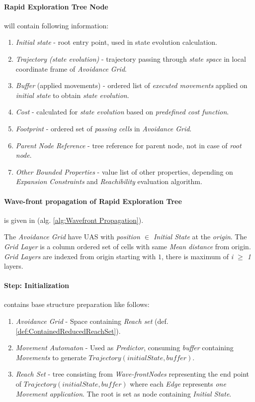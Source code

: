 \paragraph{Rapid Exploration Tree Node} will contain following information:
\begin{enumerate}
    \item \emph{Initial state} - root entry point, used in state evolution calculation.
    \item \emph{Trajectory (state evolution)} - trajectory passing through \emph{state space} in local coordinate frame of \emph{Avoidance Grid}.
    \item \emph{Buffer} (applied movements) - ordered list of \emph{executed movements} applied on \emph{initial state} to obtain \emph{state evolution}.
    \item \emph{Cost} - calculated for \emph{state evolution} based on \emph{predefined cost function}. 
    \item \emph{Footprint} - ordered set of \emph{passing cells} in \emph{Avoidance Grid}.
    \item \emph{Parent Node Reference} - tree reference for parent node, not in case of \emph{root node}.
    \item \emph{Other Bounded Properties} - value list of other properties, depending on \emph{Expansion Constraints} and \emph{Reachibility} evaluation algorithm.
\end{enumerate}

\paragraph{Wave-front propagation of Rapid Exploration Tree} is given in (alg. \ref{alg:Wavefront Propagation}). 

The \emph{Avoidance Grid} have UAS with \emph{position $\in$ Initial State} at the \emph{origin}. The \emph{Grid Layer} is a column ordered set of cells with same \emph{Mean distance} from origin. \emph{Grid Layers} are indexed from origin starting with $1$, there is maximum of \emph{i $\ge$ 1} layers.

\paragraph{Step: Initialization} contains base structure preparation like follows:
\begin{enumerate}
    \item \emph{Avoidance Grid} - Space containing \emph{Reach set} (def. \ref{def:ContainedReducedReachSet}).
    \item \emph{Movement Automaton} - Used as \emph{Predictor}, consuming \emph{buffer} containing \emph{Movements} to generate $Trajectory(initialState,buffer)$.
    
    \item \emph{Reach Set} -  tree consisting from \emph{Wave-frontNodes} representing the end point of $Trajectory(initialState,buffer)$ where each \emph{Edge} represents \emph{one Movement application}. The root is set as node containing \emph{Initial State}.
\end{enumerate}

